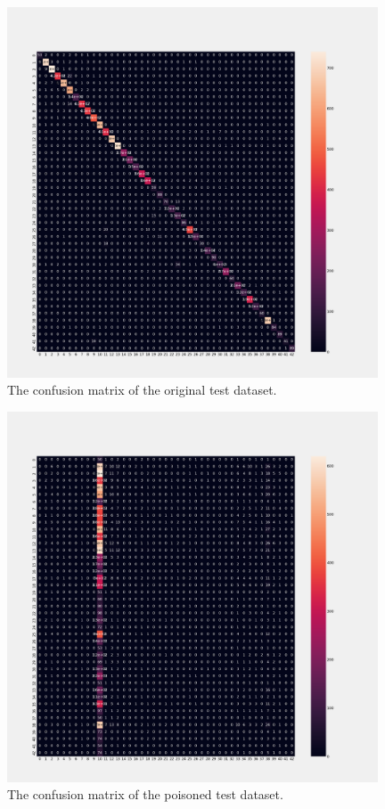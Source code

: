 \begin{figure}[ht!]
  \centering
  \includegraphics[width=11cm]{pictures/cm_original_testdata.png}
  \caption{The confusion matrix of the original test dataset.}
  \label{fig:cm_original_testdata}
\end{figure}

\begin{figure}[ht!]
  \centering
  \includegraphics[width=11cm]{pictures/cm_poisoned_testdata.png}
  \caption{The confusion matrix of the poisoned test dataset.}
  \label{fig:cm_poisoned_testdata}
\end{figure}

